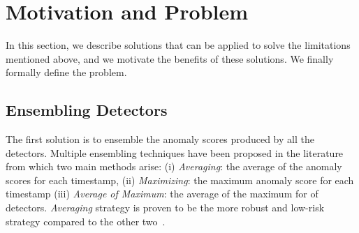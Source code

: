 \vspace{-0.1cm}
\section{Motivation and Problem}
\label{sec:problem_def}

In this section, we describe solutions that can be applied to solve the limitations mentioned above, and we motivate the benefits of these solutions. We finally formally define the problem.

\vspace{-0.1cm}
\subsection{Ensembling Detectors}


The first solution is to ensemble the anomaly scores produced by all the detectors. Multiple ensembling techniques have been proposed in the literature~\cite{10.1145/2830544.2830549} from which two main methods arise: (i) \textit{Averaging}: the average of the anomaly scores for each timestamp, (ii) \textit{Maximizing}: the maximum anomaly score for each timestamp (iii) \textit{Average of Maximum}: the average of the maximum for  of detectors. \textit{Averaging} strategy is proven to be the more robust and low-risk strategy compared to the other two~\cite{10.1145/2830544.2830549}. 
\vspace{-0.1cm}

